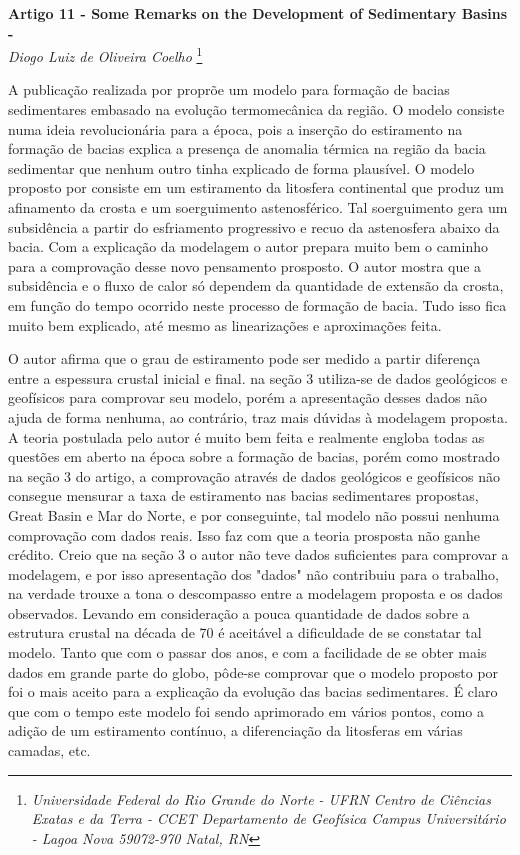 \documentclass[manuscript]{geophysics}[10pt]
\begin{document}
\begin{center}
\textbf{\LARGE
 Artigo 11 - Some Remarks on the Development of Sedimentary Basins - \cite{mckenzie_remarks_1978}} \\
\textit{Diogo Luiz de Oliveira Coelho}
\footnote{\textit{Universidade Federal do Rio Grande do Norte - UFRN
Centro de Ciências Exatas e da Terra - CCET
Departamento de Geofísica
Campus Universitário - Lagoa Nova
59072-970 Natal, RN}}
\end{center} 

A publicação realizada por \cite{mckenzie_remarks_1978} proprõe um modelo para formação de bacias sedimentares embasado na evolução termomecânica da região. O modelo consiste numa ideia revolucionária para a época, pois a inserção do estiramento na formação de bacias explica a presença de anomalia térmica na região da bacia sedimentar que nenhum outro tinha explicado de forma plausível. O modelo proposto por \cite{mckenzie_remarks_1978} consiste em um estiramento da litosfera continental que produz um afinamento da crosta e um soerguimento astenosférico. Tal soerguimento gera um subsidência a partir do esfriamento progressivo e recuo da astenosfera abaixo da bacia. Com a explicação da modelagem o autor prepara muito bem o caminho para a comprovação desse novo pensamento prosposto. O autor mostra que a subsidência e o fluxo de calor só dependem da quantidade de extensão da crosta, em função do tempo ocorrido neste processo de formação de bacia. Tudo isso fica muito bem explicado, até mesmo as linearizações e aproximações feita.

O autor afirma que o grau de estiramento pode ser medido a partir diferença entre a espessura crustal inicial e final. \cite{mckenzie_remarks_1978} na seção 3 utiliza-se de dados geológicos e geofísicos para comprovar seu modelo, porém a apresentação desses dados não ajuda de forma nenhuma, ao contrário, traz mais dúvidas à modelagem proposta. A teoria postulada pelo autor é muito bem feita e realmente engloba todas as questões em aberto na época sobre a formação de bacias, porém como mostrado na seção 3 do artigo, a comprovação através de dados geológicos e geofísicos não consegue mensurar a taxa de estiramento nas bacias sedimentares propostas, Great Basin e Mar do Norte, e por conseguinte, tal modelo não possui nenhuma comprovação com dados reais. Isso faz com que a teoria prosposta não ganhe crédito. Creio que na seção 3 o autor não teve dados suficientes para comprovar a modelagem, e por isso apresentação dos "dados" não contribuiu para o trabalho, na verdade trouxe a tona o descompasso entre a modelagem proposta e os dados observados.
Levando em consideração a pouca quantidade de dados sobre a estrutura crustal na década de 70 é aceitável a dificuldade de se constatar tal modelo. Tanto que com o passar dos anos, e com a facilidade de se obter mais dados em grande parte do globo, pôde-se comprovar que o modelo proposto por \cite{mckenzie_remarks_1978} foi o mais aceito para a explicação da evolução das bacias sedimentares. É claro que com o tempo este modelo foi sendo aprimorado em vários pontos, como a adição de um estiramento contínuo, a diferenciação da litosferas em várias camadas, etc. 



    
\end{document}
